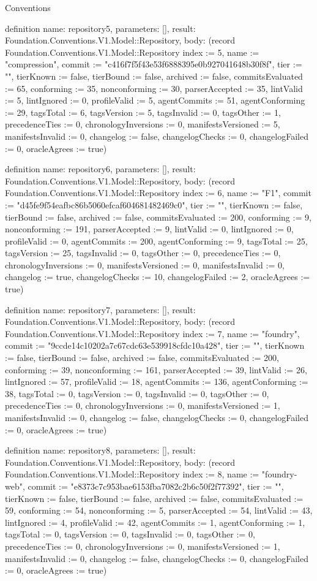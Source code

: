 \begin{lexlean}{Conventions}
\begin{semanticmodule}
definition{
  name: repository5,
  parameters: [],
  result: Foundation.Conventions.V1.Model::Repository,
  body: (record Foundation.Conventions.V1.Model::Repository {index := 5, name := "compression", commit := "c416f7f5f43e53f6888395e0b927041648b30f8f", tier := "", tierKnown := false, tierBound := false, archived := false, commitsEvaluated := 65, conforming := 35, nonconforming := 30, parserAccepted := 35, lintValid := 5, lintIgnored := 0, profileValid := 5, agentCommits := 51, agentConforming := 29, tagsTotal := 6, tagsVersion := 5, tagsInvalid := 0, tagsOther := 1, precedenceTies := 0, chronologyInversions := 0, manifestsVersioned := 5, manifestsInvalid := 0, changelog := false, changelogChecks := 0, changelogFailed := 0, oracleAgrees := true})
}

definition{
  name: repository6,
  parameters: [],
  result: Foundation.Conventions.V1.Model::Repository,
  body: (record Foundation.Conventions.V1.Model::Repository {index := 6, name := "F1", commit := "d45fe9f54eafbc86b5060efcaf604681482469c0", tier := "", tierKnown := false, tierBound := false, archived := false, commitsEvaluated := 200, conforming := 9, nonconforming := 191, parserAccepted := 9, lintValid := 0, lintIgnored := 0, profileValid := 0, agentCommits := 200, agentConforming := 9, tagsTotal := 25, tagsVersion := 25, tagsInvalid := 0, tagsOther := 0, precedenceTies := 0, chronologyInversions := 0, manifestsVersioned := 0, manifestsInvalid := 0, changelog := true, changelogChecks := 10, changelogFailed := 2, oracleAgrees := true})
}

definition{
  name: repository7,
  parameters: [],
  result: Foundation.Conventions.V1.Model::Repository,
  body: (record Foundation.Conventions.V1.Model::Repository {index := 7, name := "foundry", commit := "9ccde14c10202a7c67cdc63e539918cfdc10a428", tier := "", tierKnown := false, tierBound := false, archived := false, commitsEvaluated := 200, conforming := 39, nonconforming := 161, parserAccepted := 39, lintValid := 26, lintIgnored := 57, profileValid := 18, agentCommits := 136, agentConforming := 38, tagsTotal := 0, tagsVersion := 0, tagsInvalid := 0, tagsOther := 0, precedenceTies := 0, chronologyInversions := 0, manifestsVersioned := 1, manifestsInvalid := 0, changelog := false, changelogChecks := 0, changelogFailed := 0, oracleAgrees := true})
}

definition{
  name: repository8,
  parameters: [],
  result: Foundation.Conventions.V1.Model::Repository,
  body: (record Foundation.Conventions.V1.Model::Repository {index := 8, name := "foundry-web", commit := "e8373c7c953bae6153fba7082c2b6c50f2f77392", tier := "", tierKnown := false, tierBound := false, archived := false, commitsEvaluated := 59, conforming := 54, nonconforming := 5, parserAccepted := 54, lintValid := 43, lintIgnored := 4, profileValid := 42, agentCommits := 1, agentConforming := 1, tagsTotal := 0, tagsVersion := 0, tagsInvalid := 0, tagsOther := 0, precedenceTies := 0, chronologyInversions := 0, manifestsVersioned := 1, manifestsInvalid := 0, changelog := false, changelogChecks := 0, changelogFailed := 0, oracleAgrees := true})
}


\end{semanticmodule}
\end{lexlean}
